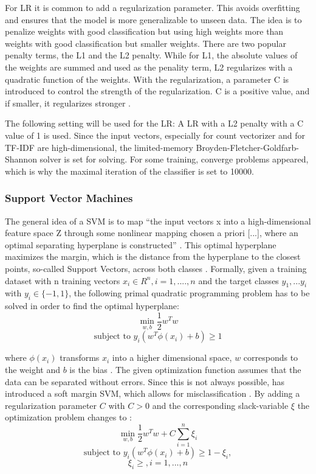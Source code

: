 \documentclass[12pt, a4paper, titlepage]{article}
\begin{document}
For \ac{LR} it is common to add a regularization parameter. This avoids overfitting and ensures that the model is more generalizable to unseen data. The idea is to penalize weights with good classification but using high weights more than weights with good classification but smaller weights. There are two popular penalty terms, the L1 and the L2 penalty. While for L1, the absolute values of the weights are summed and used as the penality term, L2 regularizes with a quadratic function of the weights. With the regularization, a parameter C is introduced to control the strength of the regularization. C is a positive value, and if smaller, it regularizes stronger \citep{jurafsky2021}. 

The following setting will be used for the \ac{LR}: A \ac{LR} with a L2 penalty with a C value of 1 is used. Since the input vectors, especially for count vectorizer and for \ac{TF-IDF} are high-dimensional, the limited-memory Broyden-Fletcher-Goldfarb-Shannon solver is set for solving. For some training, converge problems appeared, which is why the maximal iteration of the classifier is set to 10000.

\subsubsection*{Support Vector Machines}
 The general idea of a \ac{SVM} is to map ``the input vectors x into a high-dimensional feature space Z through some nonlinear mapping chosen a priori [...], where an optimal separating hyperplane is constructed'' \citep[138]{Vapnik2000}. This optimal hyperplane maximizes the margin, which is the distance from the hyperplane to the closest points, so-called Support Vectors, across both classes \citep{Han2012}. Formally, given a training dataset with n training vectors $x_i \in R^n, i = 1,....,n$ and the target classes $y_1,...y_i$ with $y_i \in \{-1, 1\}$, the following primal quadratic programming problem has to be solved in order to find the optimal hyperplane:
\[\min_{w,b} \frac{1}{2}w^{T}w \] 
\[\text{subject to } y_i(w^T\phi(x_i)+b) \geq 1\]

where $\phi(x_i)$ transforms $x_i$ into a higher dimensional space, $w$ corresponds to the weight and $b$ is the bias \citep{Chang2001,Jordan2006}.
The given optimization function assumes that the data can be separated without errors. Since this is not always possible, \cite{Cortes1995} has introduced a soft margin \ac{SVM}, which allows for misclassification \citep{Vapnik2000}.
By adding a regularization parameter $C$ with $C > 0$ and the corresponding slack-variable $\xi$ the optimization problem changes to \citep{Chang2001, Han2012}: 
\[\min_{w,b} \frac{1}{2}w^{T}w + C \sum_{i=1}^n \xi_i \] 
\[\text{subject to } y_i(w^T\phi(x_i)+b) \geq 1 - \xi_i, \] 
\[\xi_i \geq, i = 1,...,n\]
\end{document}
